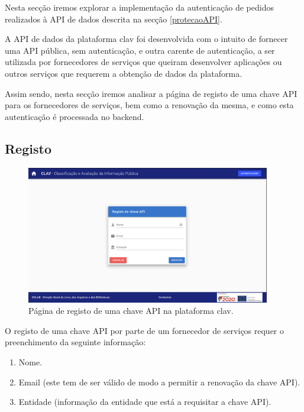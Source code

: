 Nesta secção iremos explorar a implementação da autenticação de pedidos realizados à API de dados descrita na secção \ref{protecaoAPI}.

A API de dados da plataforma \gls{clav} foi desenvolvida com o intuito de fornecer uma API pública, sem autenticação, e outra carente de autenticação, a ser utilizada por fornecedores de serviços que queiram desenvolver aplicações ou outros serviços que requerem a obtenção de dados da plataforma.

Assim sendo, nesta secção iremos analisar a página de registo de uma chave API para os fornecedores de serviços, bem como a renovação da mesma, e como esta autenticação é processada no backend.

\subsection{Registo} \label{registoChaveApi}
\begin{figure}[H]
    \centering
    \includegraphics[width=0.95\textwidth]{img/clav/authAPI/registar.png}
    \caption{Página de registo de uma chave API na plataforma \gls{clav}.}
    \label{fig:registoChaveAPI}
\end{figure}

O registo de uma chave API por parte de um fornecedor de serviços requer o preenchimento da seguinte informação:

\begin{enumerate}
    \item Nome.
    \item Email (este tem de ser válido de modo a permitir a renovação da chave API).
    \item Entidade (informação da entidade que está a requisitar a chave API).
\end{enumerate}

